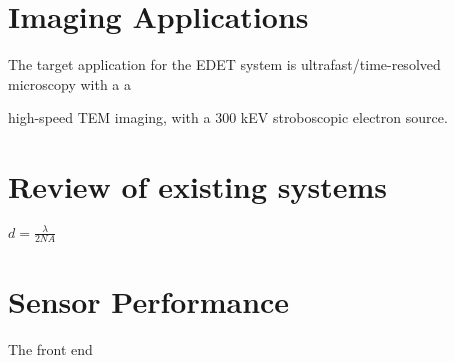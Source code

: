 \documentclass{article}
\begin{document}
\section{Imaging Applications}

The target application for the EDET system is ultrafast/time-resolved microscopy with a a 


high-speed TEM imaging, with a 300 kEV stroboscopic electron source.

\section{Review of existing systems}

$d=\frac{\lambda}{2NA}$

\section{Sensor Performance}

The front end 
\end{document}
